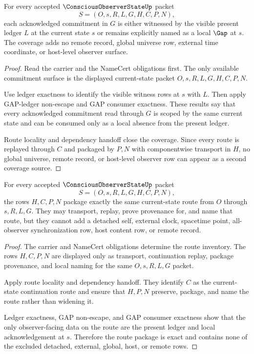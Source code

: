 \begin{theorem}
\label{thm:conscious-observer-state-local-gap-coverage}
For every accepted $\ConsciousObserverStateUp$ packet
$$
S=(O,s,R,L,G,H,C,P,N),
$$
each acknowledged commitment in $G$ is either witnessed by the visible present
ledger $L$ at the current state $s$ or remains explicitly named as a local
$\Gap$ at $s$. The coverage adds no remote record, global universe row,
external time coordinate, or host-level observer surface.
\end{theorem}
\begin{proof}
Read the carrier and the NameCert obligations first. The only available
commitment surface is the displayed current-state packet
$O,s,R,L,G,H,C,P,N$.

Use ledger exactness to identify the visible witness rows at $s$ with $L$.
Then apply GAP-ledger non-escape and GAP consumer exactness. These results say
that every acknowledged commitment read through $G$ is scoped by the same
current state and can be consumed only as a local absence from the present
ledger.

Route locality and dependency handoff close the coverage. Since every route is
replayed through $C$ and packaged by $P,N$ with componentwise transport in $H$,
no global universe, remote record, or host-level observer row can appear as a
second coverage source.
\end{proof}

\begin{theorem}
\label{thm:conscious-observer-state-route-package-exactness}
For every accepted $\ConsciousObserverStateUp$ packet
$$
S=(O,s,R,L,G,H,C,P,N),
$$
the rows $H,C,P,N$ package exactly the same current-state route from
$O$ through $s,R,L,G$. They may transport, replay, prove provenance for, and
name that route, but they cannot add a detached self, external clock,
spacetime point, all-observer synchronization row, host content row, or remote
record.
\end{theorem}
\begin{proof}
The carrier and NameCert obligations determine the route inventory. The rows
$H,C,P,N$ are displayed only as transport, continuation replay, package
provenance, and local naming for the same $O,s,R,L,G$ packet.

Apply route locality and dependency handoff. They identify $C$ as the
current-state continuation route and ensure that $H,P,N$ preserve, package,
and name the route rather than widening it.

Ledger exactness, GAP non-escape, and GAP consumer exactness show that the
only observer-facing data on the route are the present ledger and local
acknowledgement at $s$. Therefore the route package is exact and contains none
of the excluded detached, external, global, host, or remote rows.
\end{proof}

